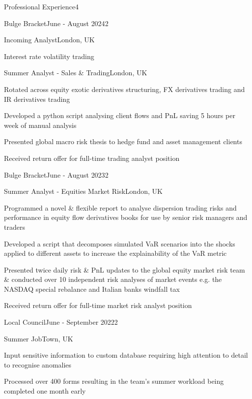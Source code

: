 \documentclass[10pt,a4paper]{CV}
\begin{document}
\begin{Section}{Professional Experience}{4}
    \begin{Institution}{Bulge Bracket}{June - August 2024}{2}
        \begin{Position}{Incoming Analyst}{London, UK}
            \item Interest rate volatility trading
            \vspace{-4pt}
        \end{Position}
        \begin{Position}{Summer Analyst - Sales \& Trading}{London, UK}
            \item Rotated across equity exotic derivatives structuring, FX derivatives trading and IR derivatives trading
            \item Developed a python script analysing client flows and PnL saving 5 hours per week of manual analysis
            \item Presented global macro risk thesis to hedge fund and asset management clients
            \item Received return offer for full-time trading analyst position
        \end{Position}
    \end{Institution}
    
    \begin{Institution}{Bulge Bracket}{June - August 2023}{2}
        \begin{Position}{Summer Analyst - Equities Market Risk}{London, UK}
            \item Programmed a novel \& flexible report to analyse dispersion trading risks and performance in equity flow derivatives books for use by senior risk managers and traders
            \item Developed a script that decomposes simulated VaR scenarios into the shocks applied to different assets to increase the explainability of the VaR metric
            \item Presented twice daily risk \& PnL updates to the global equity market risk team \& conducted over 10 independent risk analyses of market events e.g. the NASDAQ special rebalance and Italian banks windfall tax
            \item Received return offer for full-time market risk analyst position
        \end{Position}
    \end{Institution}
    
    \begin{Institution}{Local Council}{June - September 2022}{2}
        \begin{Position}{Summer Job}{Town, UK}
            \item Input sensitive information to custom database requiring high attention to detail to recognise anomalies
            \item Processed over 400 forms resulting in the team’s summer workload being completed one month early
        \end{Position}
    \end{Institution}
\end{Section}
\end{document}
